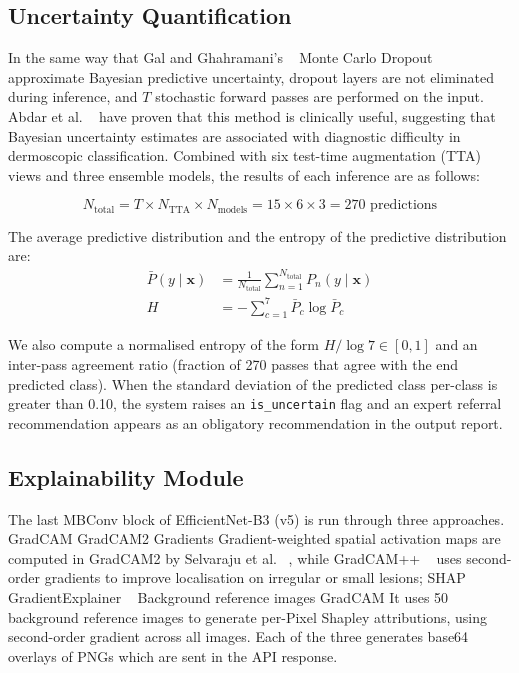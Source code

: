 \documentclass[conference]{IEEEtran}
\begin{document}
\subsection{Uncertainty Quantification}

In the same way that Gal and Ghahramani's ~\cite{gal2016dropout} Monte Carlo Dropout approximate Bayesian predictive uncertainty, dropout layers are not eliminated during inference, and $T$ stochastic forward passes are performed on the input. Abdar et al. ~\cite{abdar2021uncertainty} have proven that this method is clinically useful, suggesting that Bayesian uncertainty estimates are associated with diagnostic difficulty in dermoscopic classification. Combined with six test-time augmentation (TTA) views and three ensemble models, the results of each inference are as follows:


\begin{equation}
N_{\text{total}} = T \times N_{\text{TTA}} \times N_{\text{models}} = 15 \times 6 \times 3 = 270 \text{ predictions}
\end{equation}

The average predictive distribution and the entropy of the predictive distribution are:
\begin{align}
\bar{P}(y \mid \mathbf{x}) &= \frac{1}{N_{\text{total}}} \sum_{n=1}^{N_{\text{total}}} P_n(y \mid \mathbf{x}) \\
H &= -\sum_{c=1}^{7} \bar{P}_c \log \bar{P}_c
\end{align}

We also compute a normalised entropy of the form $H / \log 7 \in [0,1]$ and an inter-pass agreement ratio (fraction of 270 passes that agree with the end predicted class). When the standard deviation of the predicted class per-class is greater than 0.10, the system raises an \texttt{is\_uncertain} flag and an expert referral recommendation appears as an obligatory recommendation in the output report.

\subsection{Explainability Module}

The last MBConv block of EfficientNet-B3 (v5) is run through three approaches. GradCAM GradCAM2 Gradients Gradient-weighted spatial activation maps are computed in GradCAM2 by Selvaraju et al. ~\cite{selvaraju2017gradcam}, while GradCAM++ ~\cite{chattopadhay2018gradcampp} uses second-order gradients to improve localisation on irregular or small lesions; SHAP GradientExplainer ~\cite{lundberg2017shap} Background reference images GradCAM It uses 50 background reference images to generate per-Pixel Shapley attributions, using second-order gradient across all images. Each of the three generates base64 overlays of PNGs which are sent in the API response.
\end{document}
